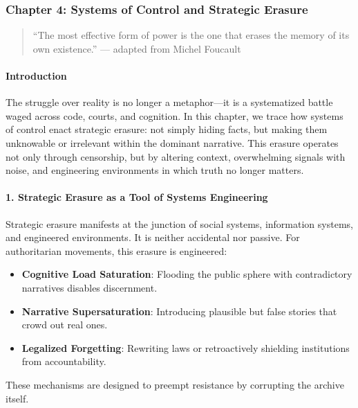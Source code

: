 \subsubsection{Chapter 4: Systems of Control and Strategic
Erasure}\label{chapter-4-systems-of-control-and-strategic-erasure}

\begin{quote}
``The most effective form of power is the one that erases the memory of
its own existence.'' --- adapted from Michel Foucault
\end{quote}

\paragraph{Introduction}\label{introduction}

The struggle over reality is no longer a metaphor---it is a systematized
battle waged across code, courts, and cognition. In this chapter, we
trace how systems of control enact strategic erasure: not simply hiding
facts, but making them unknowable or irrelevant within the dominant
narrative. This erasure operates not only through censorship, but by
altering context, overwhelming signals with noise, and engineering
environments in which truth no longer matters.

\paragraph{1. Strategic Erasure as a Tool of Systems
Engineering}\label{strategic-erasure-as-a-tool-of-systems-engineering}

Strategic erasure manifests at the junction of social systems,
information systems, and engineered environments. It is neither
accidental nor passive. For authoritarian movements, this erasure is
engineered:

\begin{itemize}
\tightlist
\item
  \textbf{Cognitive Load Saturation}: Flooding the public sphere with
  contradictory narratives disables discernment.
\item
  \textbf{Narrative Supersaturation}: Introducing plausible but false
  stories that crowd out real ones.
\item
  \textbf{Legalized Forgetting}: Rewriting laws or retroactively
  shielding institutions from accountability.
\end{itemize}

These mechanisms are designed to preempt resistance by corrupting the
archive itself.

